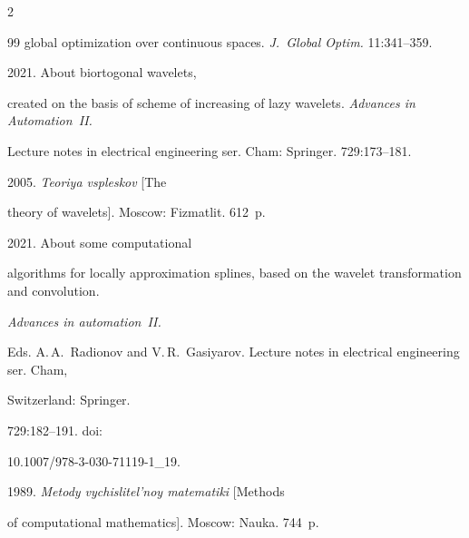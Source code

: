 \begin{multicols}{2}
{{\begin{thebibliography}{99}
global optimization over continuous spaces. \textit{J.~Global Optim.} 11:341--359.




 2021. About biortogonal wavelets, 


created on the basis of scheme of increasing of lazy wavelets. \textit{Advances in Automation~II.} 


Lecture notes in electrical engineering ser. Cham: Springer. 729:173--181. 




 2005. \textit{Teoriya vspleskov} [The 


theory of wavelets]. Moscow: Fizmatlit. 612~p.




 2021. About some computational 


algorithms for locally approximation splines, based on the wavelet transformation and convolution. 


\textit{Advances in automation~II.}


Eds. A.\,A.~Radionov and V.\,R.~Gasiyarov. Lecture notes in electrical engineering ser. Cham,


Switzerland: Springer. 


729:182--191.  doi: 


10.1007/978-3-030-71119-1\_19.




 1989. \textit{Metody vychislitel'noy matematiki} [Methods 


of computational mathematics]. Moscow: Nauka. 744~p.


\end{thebibliography}





 }


 }





\end{multicols}





\vspace*{-6pt}





